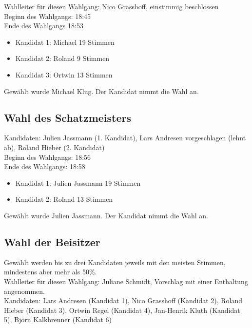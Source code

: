 \documentclass[a4paper,12pt]{scrartcl}
\begin{document}
Wahlleiter für diesen Wahlgang: Nico Grasshoff, einstimmig beschlossen \\

Beginn des Wahlgangs: 18:45 \\
Ende des Wahlgangs 18:53

\begin{itemize}
    \item Kandidat 1: Michael 19 Stimmen
    \item Kandidat 2: Roland 9 Stimmen
    \item Kandidat 3: Ortwin 13 Stimmen
\end{itemize}

Gewählt wurde Michael Klug. Der Kandidat nimmt die Wahl an.

\subsection{Wahl des Schatzmeisters}

Kandidaten: Julien Jassmann (1. Kandidat), Lars Andresen vorgeschlagen (lehnt
ab), Roland Hieber (2. Kandidat) \\

Beginn des Wahlgangs: 18:56 \\
Ende des Wahlgangs: 18:58

\begin{itemize}
    \item Kandidat 1: Julien Jassmann 19 Stimmen
    \item Kandidat 2: Roland 13 Stimmen
\end{itemize}

Gewählt wurde Julien Jassmann. Der Kandidat nimmt die Wahl an.

\subsection{Wahl der Beisitzer}

Gew\"ahlt werden bis zu drei Kandidaten jeweils mit den meisten Stimmen,
mindestens aber mehr als 50\%. \\

Wahlleiter f\"ur diesen Wahlgang: Juliane Schmidt, Vorschlag mit einer
Enthaltung angenommen. \\

Kandidaten: Lars Andresen (Kandidat 1), Nico Grasshoff (Kandidat 2), Roland
Hieber (Kandidat 3), Ortwin Regel (Kandidat 4), Jan-Henrik Kluth (Kandidat 5),
Björn Kalkbrenner (Kandidat 6) \\
\end{document}
